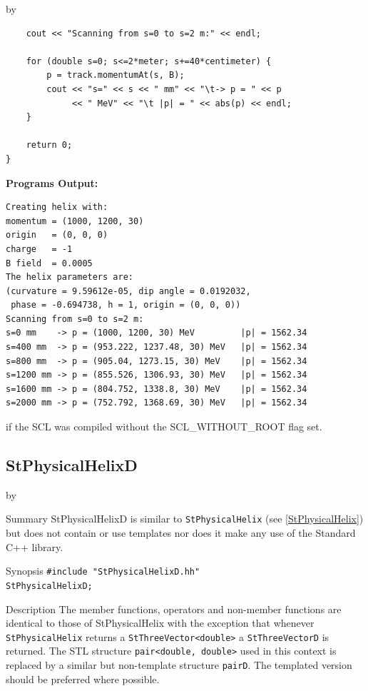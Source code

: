 \documentclass[twoside]{article}
\newcommand{\name}[1]{\textsf{#1}}%
\newcommand{\entrylabel}[1]{\mbox{\textbf{{#1}}}\hfil}%
\newenvironment{entry}
{\begin{list}{}%
    {\renewcommand{\makelabel}{\entrylabel}%
     \setlength{\labelwidth}{90pt}%
     \setlength{\leftmargin}{\labelwidth}
     \advance\leftmargin by \labelsep%
      }%
    }%
  {\end{list}}
\newcommand{\Entrylabel}[1]%
{\raisebox{0pt}[1ex][0pt]{\makebox[\labelwidth][l]%
    {\parbox[t]{\labelwidth}{\hspace{0pt}\textbf{{#1}}}}}}
\newenvironment{Entry}%
{\renewcommand{\entrylabel}{\Entrylabel}\begin{entry}}%
  {\end{entry}}
\begin{document}
\begin{description}
\begin{Entry}
{\begin{verbatim}
    cout << "Scanning from s=0 to s=2 m:" << endl;

    for (double s=0; s<=2*meter; s+=40*centimeter) {
        p = track.momentumAt(s, B);
        cout << "s=" << s << " mm" << "\t-> p = " << p
             << " MeV" << "\t |p| = " << abs(p) << endl; 
    }
    
    return 0;
}
\end{verbatim}
}%
{\bf Programs Output:}
{\footnotesize
\begin{verbatim}
Creating helix with:
momentum = (1000, 1200, 30)
origin   = (0, 0, 0)
charge   = -1
B field  = 0.0005
The helix parameters are:
(curvature = 9.59612e-05, dip angle = 0.0192032,
 phase = -0.694738, h = 1, origin = (0, 0, 0))
Scanning from s=0 to s=2 m:
s=0 mm    -> p = (1000, 1200, 30) MeV         |p| = 1562.34
s=400 mm  -> p = (953.222, 1237.48, 30) MeV   |p| = 1562.34
s=800 mm  -> p = (905.04, 1273.15, 30) MeV    |p| = 1562.34
s=1200 mm -> p = (855.526, 1306.93, 30) MeV   |p| = 1562.34
s=1600 mm -> p = (804.752, 1338.8, 30) MeV    |p| = 1562.34
s=2000 mm -> p = (752.792, 1368.69, 30) MeV   |p| = 1562.34
\end{verbatim}
} %
\end{Entry}

\clearpage
    if the SCL was compiled without the \name{SCL\_WITHOUT\_ROOT} flag set.
%
%
\subsection{StPhysicalHelixD } \label{StPhysicalHelixD}
\begin{Entry}
\item[Summary]
    StPhysicalHelixD is similar to \texttt{StPhysicalHelix}
    (see \ref{StPhysicalHelix}) but does not contain or use templates nor
    does it make any use of the Standard C++ library. 
    
\item[Synopsis]
    \verb+#include "StPhysicalHelixD.hh"+ \\
    \verb+StPhysicalHelixD;+
    
    
\item[Description]       
    The member functions, operators and non-member functions are identical
    to those of StPhysicalHelix with the exception that whenever \texttt{StPhysicalHelix} returns a
    \verb+StThreeVector<double>+ a \texttt{StThreeVectorD} is returned.
    The STL structure \verb+pair<double, double>+ used in this context is replaced
    by a similar but non-template structure \texttt{pairD}. 
    The templated version should be preferred where possible.


\end{Entry}
\end{description}
\end{document}
